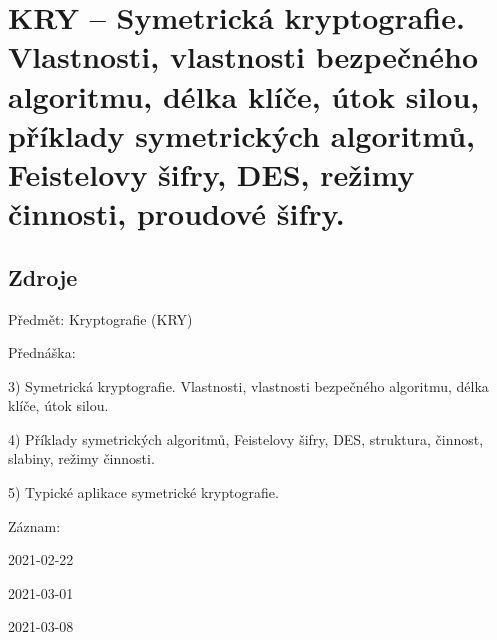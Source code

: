 

\graphicspath{{kry/symetricka_kryptografie/figures}}


\chapter{KRY -- Symetrická kryptografie. Vlastnosti, vlastnosti bezpečného algoritmu, délka klíče, útok silou, příklady symetrických algoritmů, Feistelovy šifry, DES, režimy činnosti, proudové šifry.}



\section{Zdroje}

\begin{compactitem}
    \item Předmět: Kryptografie (KRY)
    \item Přednáška:
    \begin{compactitem}
        \item 3) Symetrická kryptografie. Vlastnosti, vlastnosti bezpečného algoritmu, délka klíče, útok silou.
        \item 4) Příklady symetrických algoritmů, Feistelovy šifry, DES, struktura, činnost, slabiny, režimy činnosti.
        \item 5) Typické aplikace symetrické kryptografie.
    \end{compactitem}
    \item Záznam:
    \begin{compactitem}
        \item 2021-02-22
        \item 2021-03-01
        \item 2021-03-08
    \end{compactitem}
\end{compactitem}


